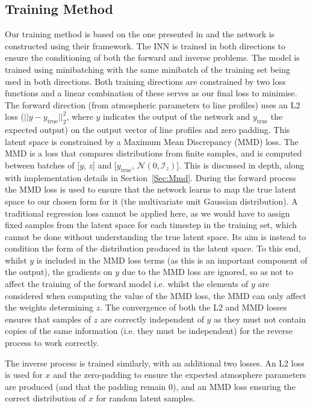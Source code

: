 \subsection{Training Method}

Our training method is based on the one presented in \citet{2018Ardizzone} and the network is constructed using their framework. \NeedRef{}
The INN is trained in both directions to ensure the conditioning of both the forward and inverse problems.
The model is trained using minibatching with the same minibatch of the training set being used in both directions.
Both training directions are constrained by two loss functions and a linear combination of these serves as our final loss to minimise.
The forward direction (from atmospheric parameters to line profiles) uses an L2 loss ($||y-y_\mathrm{true}||_2^2$, where $y$ indicates the output of the network and $y_\mathrm{true}$ the expected output) on the output vector of line profiles and zero padding.
This latent space is constrained by a Maximum Mean Discrepancy (MMD) loss.
The MMD is a loss that compares distributions from finite samples, and is computed between batches of [$y$, $z$] and [$y_\mathrm{true}$, $\mathcal{N}(0, \mathcal{I}_z)$].
This is discussed in depth, along with implementation details in Section~\ref{Sec:Mmd}.
During the forward process the MMD loss is used to ensure that the network learns to map the true latent space to our chosen form for it (the multivariate unit Gaussian distribution).
A traditional regression loss cannot be applied here, as we would have to assign fixed samples from the latent space for each timestep in the training set, which cannot be done without understanding the true latent space.
Its aim is instead to condition the form of the distribution produced in the latent space.
To this end, whilst $y$ is included in the MMD loss terms (as this is an important component of the output), the gradients on $y$ due to the MMD loss are ignored, so as not to affect the training of the forward model i.e. whilst the elements of $y$ are considered when computing the value of the MMD loss, the MMD can only affect the weights determining $z$.
The convergence of both the L2 and MMD losses ensures that samples of $z$ are correctly independent of $y$ as they must not contain copies of the same information (i.e. they must be independent) for the reverse process to work correctly.

The inverse process is trained similarly, with an additional two losses.
An L2 loss is used for $x$ and the zero-padding to ensure the expected atmosphere parameters are produced (and that the padding remain 0), and an MMD loss ensuring the correct distribution of $x$ for random latent samples.

